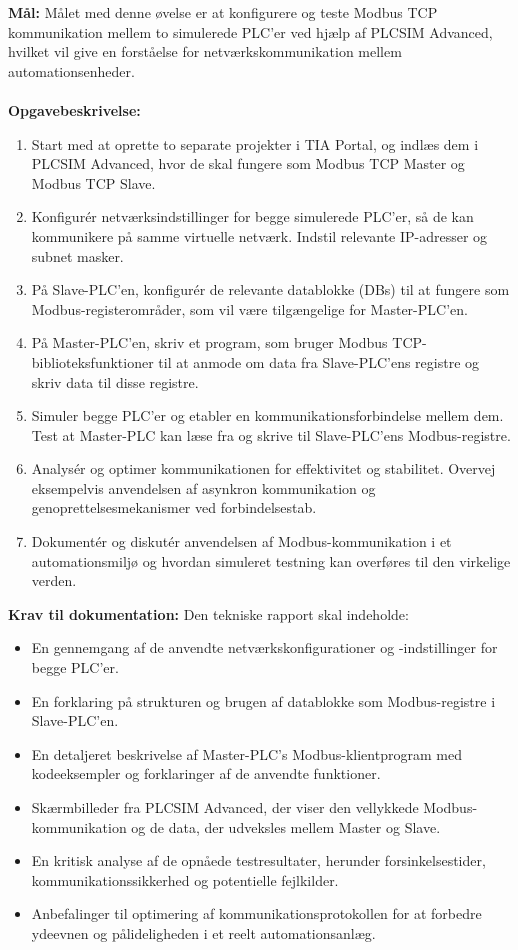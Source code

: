 \textbf{Mål:} Målet med denne øvelse er at konfigurere og teste Modbus TCP kommunikation mellem to simulerede PLC'er ved hjælp af PLCSIM Advanced, hvilket vil give en forståelse for netværkskommunikation mellem automationsenheder.
\\\\
\noindent\textbf{Opgavebeskrivelse:}
\begin{enumerate}
	\item Start med at oprette to separate projekter i TIA Portal, og indlæs dem i PLCSIM Advanced, hvor de skal fungere som Modbus TCP Master og Modbus TCP Slave.
	\item Konfigurér netværksindstillinger for begge simulerede PLC'er, så de kan kommunikere på samme virtuelle netværk. Indstil relevante IP-adresser og subnet masker.
	\item På Slave-PLC'en, konfigurér de relevante datablokke (DBs) til at fungere som Modbus-registerområder, som vil være tilgængelige for Master-PLC'en.
	\item På Master-PLC'en, skriv et program, som bruger Modbus TCP-biblioteksfunktioner til at anmode om data fra Slave-PLC'ens registre og skriv data til disse registre.
	\item Simuler begge PLC'er og etabler en kommunikationsforbindelse mellem dem. Test at Master-PLC kan læse fra og skrive til Slave-PLC'ens Modbus-registre.
	\item Analysér og optimer kommunikationen for effektivitet og stabilitet. Overvej eksempelvis anvendelsen af asynkron kommunikation og genoprettelsesmekanismer ved forbindelsestab.
	\item Dokumentér og diskutér anvendelsen af Modbus-kommunikation i et automationsmiljø og hvordan simuleret testning kan overføres til den virkelige verden.
\end{enumerate}	
\textbf{Krav til dokumentation:}
Den tekniske rapport skal indeholde:
\begin{itemize}
	\item En gennemgang af de anvendte netværkskonfigurationer og -indstillinger for begge PLC'er.
	\item En forklaring på strukturen og brugen af datablokke som Modbus-registre i Slave-PLC'en.
	\item En detaljeret beskrivelse af Master-PLC's Modbus-klientprogram med kodeeksempler og forklaringer af de anvendte funktioner.
	\item Skærmbilleder fra PLCSIM Advanced, der viser den vellykkede Modbus-kommunikation og de data, der udveksles mellem Master og Slave.
	\item En kritisk analyse af de opnåede testresultater, herunder forsinkelsestider, kommunikationssikkerhed og potentielle fejlkilder.
	\item Anbefalinger til optimering af kommunikationsprotokollen for at forbedre ydeevnen og pålideligheden i et reelt automationsanlæg.
\end{itemize}


